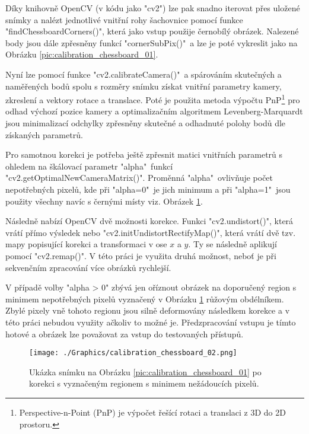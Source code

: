 \documentclass[czech, bc, kky, he, iso690numb]{fasthesis}
\begin{document}
	        	Díky knihovně OpenCV (v kódu jako \command"cv2") lze pak snadno iterovat přes uložené snímky a nalézt jednotlivé vnitřní rohy šachovnice pomocí funkce \command"findChessboardCorners()", která jako vstup použije černobílý obrázek. Nalezené body jsou dále zpřesněny funkcí \command"cornerSubPix()"\ a lze je poté vykreslit jako na Obrázku \ref{pic:calibration_chessboard_01}.
	        	
	        	Nyní lze pomocí funkce \command"cv2.calibrateCamera()"\ a spárováním skutečných a naměřených bodů spolu s rozměry snímku získat vnitřní parametry kamery, zkreslení a vektory rotace a translace. Poté je použita metoda výpočtu PnP\footnote{Perspective-n-Point (PnP) je výpočet řešící rotaci a translaci z 3D do 2D prostoru.} pro odhad výchozí pozice kamery a optimalizačním algoritmem Levenberg-Marquardt jsou minimalizací odchylky zpřesněny skutečné a odhadnuté polohy bodů dle získaných parametrů. 
	        	
	        	Pro samotnou korekci je potřeba ještě zpřesnit matici vnitřních parametrů s ohledem na škálovací parametr \command"alpha"\ funkcí \command"cv2.getOptimalNewCameraMatrix()". Proměnná \command"alpha"\ ovlivňuje počet nepotřebných pixelů, kde při \command"alpha=0"\ je jich minimum a při \command"alpha=1"\ jsou použity všechny navíc s černými místy viz. Obrázek \ref{pic:calibration_chessboard_02}.
	        	
	        	Následně nabízí OpenCV dvě možnosti korekce. Funkci \command"cv2.undistort()", která vrátí přímo výsledek nebo \command"cv2.initUndistortRectifyMap()", která vrátí dvě tzv. mapy popisující korekci a transformaci v ose \(x\) a \(y\). Ty se následně aplikují pomocí \command"cv2.remap()". V této práci je využita druhá možnost, neboť je při sekvenčním zpracování více obrázků rychlejší.
	        	
	        	V případě volby \command"alpha > 0" zbývá jen oříznout obrázek na doporučený region s minimem nepotřebných pixelů vyznačený v Obrázku \ref{pic:calibration_chessboard_02} růžovým obdélníkem. Zbylé pixely vně tohoto regionu jsou silně deformovány následkem korekce a v této práci nebudou využity ačkoliv to možné je. Předzpracování vstupu je tímto hotové a obrázek lze považovat za vstup do testovaných přístupů.
	        	
	        		\begin{figure}[h]
	        			\centering
	        			\texttt{[image: ./Graphics/calibration\_chessboard\_02.png]}
	        			\caption{Ukázka snímku na Obrázku \ref{pic:calibration_chessboard_01} po korekci s vyznačeným regionem s minimem nežádoucích pixelů.}
	        			\label{pic:calibration_chessboard_02}
	        		\end{figure}
	        	
\end{document}
